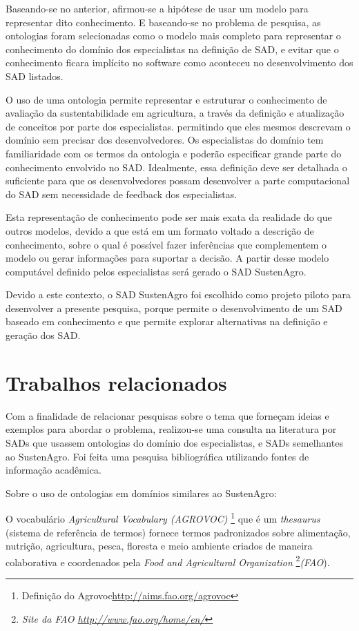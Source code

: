 Baseando-se no anterior, afirmou-se a hipótese de usar um modelo para
representar dito conhecimento. E baseando-se no problema de pesquisa,
as ontologias foram selecionadas como o modelo mais completo para
representar o conhecimento do domínio dos especialistas na definição
de SAD, e evitar que o conhecimento ficara implícito no software como
aconteceu no desenvolvimento dos SAD listados.

O uso de uma ontologia permite representar e estruturar o conhecimento
de avaliação da sustentabilidade em agricultura, a través da definição
e atualização de conceitos por parte dos especialistas. permitindo
que eles mesmos descrevam o domínio sem precisar dos desenvolvedores.
Os especialistas do domínio tem familiaridade com os termos da ontologia
e poderão especificar grande parte do conhecimento envolvido no SAD.
Idealmente, essa definição deve ser detalhada o suficiente para que
os desenvolvedores possam desenvolver a parte computacional do SAD
sem necessidade de \foreignlanguage{english}{feedback} dos especialistas.

Esta representação de conhecimento pode ser mais exata da realidade
do que outros modelos, devido a que está em um formato voltado a descrição
de conhecimento, sobre o qual é possível fazer inferências que complementem
o modelo ou gerar informações para suportar a decisão. A partir desse
modelo computável definido pelos especialistas será gerado o SAD SustenAgro. 

Devido a este contexto, o SAD SustenAgro foi escolhido como projeto
piloto para desenvolver a presente pesquisa, porque permite o desenvolvimento
de um SAD baseado em conhecimento e que permite explorar alternativas
na definição e geração dos SAD.

\section{Trabalhos relacionados}

Com a finalidade de relacionar pesquisas sobre o tema que forneçam
ideias e exemplos para abordar o problema, realizou-se uma consulta
na literatura por SADs que usassem ontologias do domínio dos especialistas,
e SADs semelhantes ao SustenAgro. Foi feita uma pesquisa bibliográfica
utilizando fontes de informação acadêmica.

Sobre o uso de ontologias em domínios similares ao SustenAgro:

O vocabulário\emph{ }\foreignlanguage{english}{\emph{Agricultural
Vocabulary (AGROVOC)}}
\footnote{Definição do Agrovoc\url{http://aims.fao.org/agrovoc}}
que é um \foreignlanguage{english}{\emph{thesaurus}} (sistema de referência
de termos) fornece termos padronizados sobre alimentação, nutrição,
agricultura, pesca, floresta e meio ambiente criados de maneira colaborativa
e coordenados pela \foreignlanguage{english}{\emph{Food and Agricultural
Organization}}\emph{ }\footnote{\emph{Site da FAO \url{http://www.fao.org/home/en/}}}\emph{(FAO}). 

